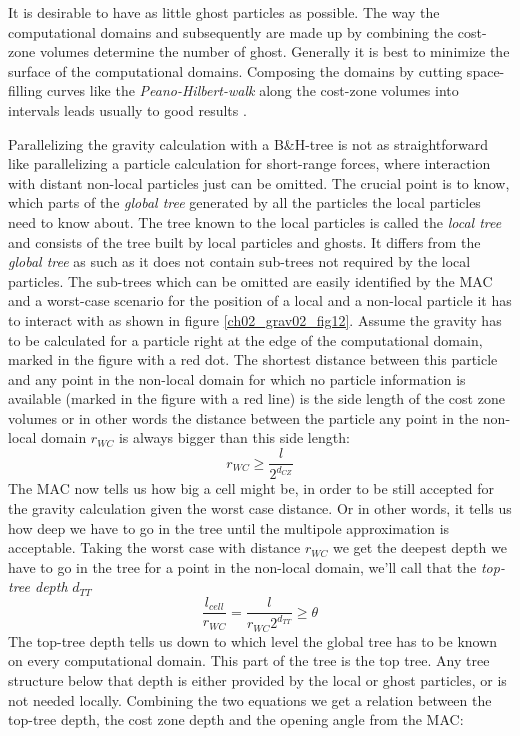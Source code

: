 It is desirable to have as little ghost particles as possible. The way the computational domains and subsequently are made up by combining the cost-zone volumes determine the number of ghost. Generally it is best to minimize the surface of the computational domains. Composing the domains by cutting space-filling curves like the \emph{Peano-Hilbert-walk} along the cost-zone volumes into intervals leads usually to good results \citep{Springel:2005p51}.

Parallelizing the gravity calculation with a  B\&H-tree is not as straightforward like parallelizing a particle calculation for short-range forces, where interaction with distant non-local particles just can be omitted. The crucial point is to know, which parts of the \emph{global tree} generated by all the particles the local particles need to know about. The tree known to the local particles is called the \emph{local tree} and consists of the tree built by local particles and ghosts. It differs from the \emph{global tree} as such as it does not contain sub-trees not required by the local particles. The sub-trees which can be omitted are easily identified by the MAC and a worst-case scenario for the position of a local and a non-local particle it has to interact with as shown in figure \ref{ch02_grav02_fig12}. Assume the gravity has to be calculated for a particle right at the edge of the computational domain, marked in the figure with a red dot.  The shortest distance between this particle and any point in the non-local domain for which no particle information is available (marked in the figure with a red line) is the side length of the cost zone volumes or in other words the distance between the particle any point in the non-local domain $r_{WC}$ is always bigger than this side length:
\begin{equation}
r_{WC} \ge \frac{l}{2^{d_{CZ}} } 
\end{equation}
The MAC now tells us how big a cell might be, in order to be still accepted for the gravity calculation given the worst case distance. Or in other words, it tells us how deep we have to go in the tree until the multipole approximation is acceptable. Taking the worst case with distance $r_{WC}$ we get the deepest depth we have to go in the tree for a point in the non-local domain, we'll call that the \emph{top-tree depth} $d_{TT}$
\begin{equation}
\frac{l_{cell}}{r_{WC}} = \frac{l}{r_{WC} 2^{d_{TT}}} \ge \theta
\end{equation}
The top-tree depth tells us down to which level the global tree has to be known on every computational domain. This part of the tree is the top tree. Any tree structure below that depth is either provided by the local or ghost particles, or is not needed locally. Combining the two equations we get a relation between the top-tree depth, the cost zone depth and the opening angle from the MAC:
